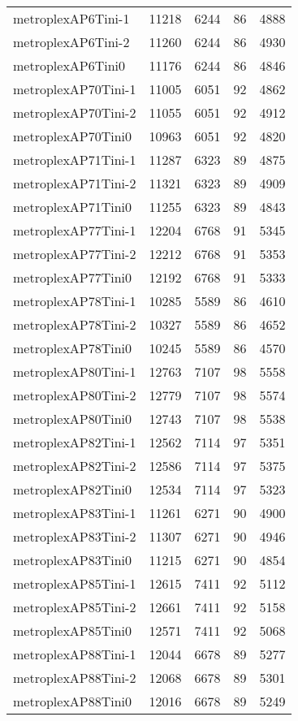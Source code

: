 \begin{longtable}{lrrrr}
metroplexAP6Tini-1 & 11218 & 6244 & 86 & 4888 \\
metroplexAP6Tini-2 & 11260 & 6244 & 86 & 4930 \\
metroplexAP6Tini0 & 11176 & 6244 & 86 & 4846 \\
metroplexAP70Tini-1 & 11005 & 6051 & 92 & 4862 \\
metroplexAP70Tini-2 & 11055 & 6051 & 92 & 4912 \\
metroplexAP70Tini0 & 10963 & 6051 & 92 & 4820 \\
metroplexAP71Tini-1 & 11287 & 6323 & 89 & 4875 \\
metroplexAP71Tini-2 & 11321 & 6323 & 89 & 4909 \\
metroplexAP71Tini0 & 11255 & 6323 & 89 & 4843 \\
metroplexAP77Tini-1 & 12204 & 6768 & 91 & 5345 \\
metroplexAP77Tini-2 & 12212 & 6768 & 91 & 5353 \\
metroplexAP77Tini0 & 12192 & 6768 & 91 & 5333 \\
metroplexAP78Tini-1 & 10285 & 5589 & 86 & 4610 \\
metroplexAP78Tini-2 & 10327 & 5589 & 86 & 4652 \\
metroplexAP78Tini0 & 10245 & 5589 & 86 & 4570 \\
metroplexAP80Tini-1 & 12763 & 7107 & 98 & 5558 \\
metroplexAP80Tini-2 & 12779 & 7107 & 98 & 5574 \\
metroplexAP80Tini0 & 12743 & 7107 & 98 & 5538 \\
metroplexAP82Tini-1 & 12562 & 7114 & 97 & 5351 \\
metroplexAP82Tini-2 & 12586 & 7114 & 97 & 5375 \\
metroplexAP82Tini0 & 12534 & 7114 & 97 & 5323 \\
metroplexAP83Tini-1 & 11261 & 6271 & 90 & 4900 \\
metroplexAP83Tini-2 & 11307 & 6271 & 90 & 4946 \\
metroplexAP83Tini0 & 11215 & 6271 & 90 & 4854 \\
metroplexAP85Tini-1 & 12615 & 7411 & 92 & 5112 \\
metroplexAP85Tini-2 & 12661 & 7411 & 92 & 5158 \\
metroplexAP85Tini0 & 12571 & 7411 & 92 & 5068 \\
metroplexAP88Tini-1 & 12044 & 6678 & 89 & 5277 \\
metroplexAP88Tini-2 & 12068 & 6678 & 89 & 5301 \\
metroplexAP88Tini0 & 12016 & 6678 & 89 & 5249 \\

\end{longtable}
